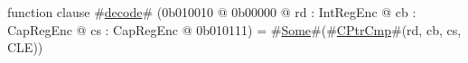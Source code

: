 function clause #\hyperref[sailMIPSzdecode]{decode}# (0b010010 @ 0b00000 @ rd : IntRegEnc @ cb : CapRegEnc @ cs : CapRegEnc @ 0b010111) = #\hyperref[sailMIPSzSome]{Some}#(#\hyperref[sailMIPSzCPtrCmp]{CPtrCmp}#(rd, cb, cs, CLE))
